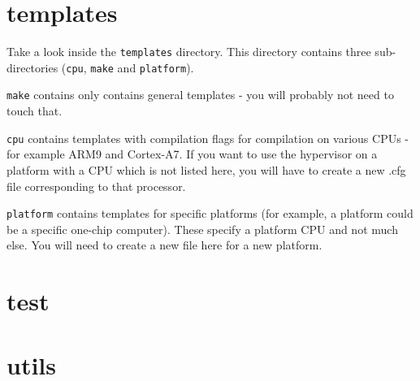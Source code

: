 \documentclass[a4paper,11pt,reqno]{amsart}
\begin{document}
\section{templates}
Take a look inside the \texttt{templates} directory. This directory contains three sub-directories (\texttt{cpu}, \texttt{make} and \texttt{platform}).

\texttt{make} contains only contains general templates - you will probably not need to touch that. 

\texttt{cpu} contains templates with compilation flags for compilation on various CPUs - for example ARM9 and Cortex-A7. If you want to use the hypervisor on a platform with a CPU which is not listed here, you will have to create a new .cfg file corresponding to that processor.

\texttt{platform} contains templates for specific platforms (for example, a platform could be a specific one-chip computer). These specify a platform CPU and not much else. You will need to create a new file here for a new platform.

\section{test}

\section{utils}
\end{document}
